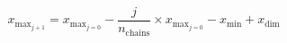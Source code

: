 % 
% 
% 
% 
% 
% 
% 


\begin{equation}
x_{\text{max}_{j + 1}} = x_{\text{max}_{j = 0}} - \frac{j}{n_\text{chains}} \times x_{\text{max}_{j = 0}} - 
x_\text{min} + x_\text{dim}
\end{equation}
